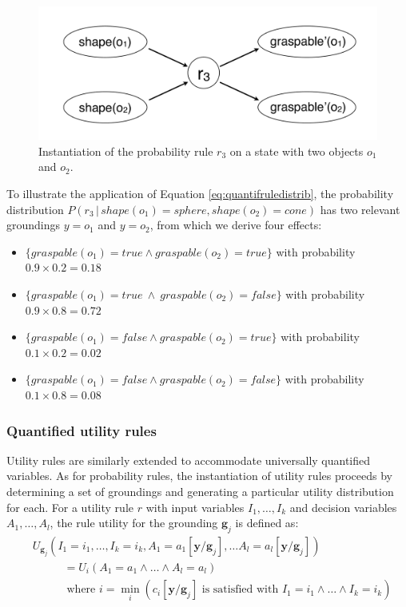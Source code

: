 \begin{figure}[h]
\centering
\includegraphics[scale=0.25]{imgs/quantruleinstantiation.pdf}
\caption{Instantiation of the probability rule $r_3$ on a state with two objects $o_1$ and $o_2$.}
\label{fig:quantinstantitionprob}
\end{figure}

To illustrate the application of Equation \eqref{eq:quantifruledistrib}, the probability distribution $P(r_3 \, | \, \mathit{shape}(o_1)\!=\!\mathit{sphere}, \mathit{shape}(o_2)\!=\!\mathit{cone})$ has two relevant groundings $y\!=\!o_1$ and $y\!=\!o_2$, from which we derive four effects:
\begin{itemize}
\item $\{\mathit{graspable}(o_1)\!=\!true \land \mathit{graspable}(o_2)\!=\!true \} $ with probability $0.9\times0.2\!=\!0.18$
\item $\{\mathit{graspable}(o_1)\!=\!true \ \land \  \mathit{graspable}(o_2)\!=\!false\}$ with probability $0.9\times0.8\!=\!0.72$ 
\item $\{ \mathit{graspable}(o_1)\!=\!false \land \mathit{graspable}(o_2)\!=\!true \}$ with probability $0.1\times0.2\!=\!0.02$
\item $\{\mathit{graspable}(o_1)\!=\!false \land \mathit{graspable}(o_2)\!=\!false\}$ with probability $0.1\times0.8\!=\!0.08$
\end{itemize}


\subsubsection*{Quantified utility rules}

Utility rules are similarly extended to accommodate universally quantified variables. As for probability rules, the instantiation of utility rules proceeds by determining a set of groundings and generating a particular utility distribution for each. 
For a utility rule $r$ with input variables $I_1, \dots, I_k$ and decision variables $A_1, \dots, A_l$, the rule utility for the grounding $\mathbf{g}_j$ is defined as:
 \begin{align}
& U_{\mathbf{g}_j}(I_1\!=\!i_1, \dots, I_k\!=\!i_k, A_1\!=\!a_1[\mathbf{y} / \mathbf{g}_j], \dots A_l\!=\!a_l[\mathbf{y} / \mathbf{g}_j] ) \\ 
& \; \; \; \; \; \; \; \;   \; \; = U_i(A_1\!=\!a_1 \land \dots \land A_l\!=\!a_l) \nonumber \\
& \; \; \; \; \; \; \; \;   \; \; \;\text{where } i = \min_i (c_i[\mathbf{y} / \mathbf{g}_j]\text{ is satisfied with } I_1\!=\!i_1 \land \dots \land I_k\!=\!i_k) \nonumber
\end{align}

